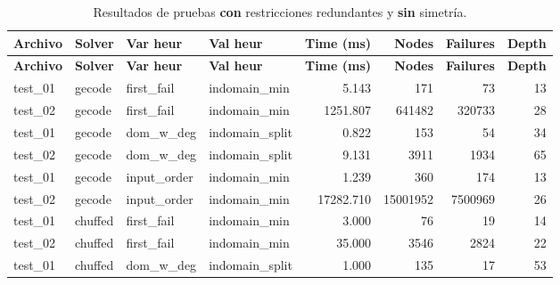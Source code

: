 \begin{longtable}{l l l l r r r r}
    \caption{Resultados de pruebas \textbf{con} restricciones redundantes y \textbf{sin} simetría.}\label{tab:pruebas-jobshop_mantenimiento-on-off-1}     \\
    \toprule
    \textbf{Archivo} & \textbf{Solver} & \textbf{Var heur} & \textbf{Val heur} & \textbf{Time (ms)} & \textbf{Nodes} & \textbf{Failures} & \textbf{Depth} \\
    \midrule
    \endfirsthead
    \toprule
    \textbf{Archivo} & \textbf{Solver} & \textbf{Var heur} & \textbf{Val heur} & \textbf{Time (ms)} & \textbf{Nodes} & \textbf{Failures} & \textbf{Depth} \\
    \midrule
    \endhead
    \bottomrule
    \endlastfoot

    test\_01         & gecode          & first\_fail       & indomain\_min     & 5.143              & 171            & 73                & 13             \\
    test\_02         & gecode          & first\_fail       & indomain\_min     & 1251.807           & 641482         & 320733            & 28             \\
    \midrule
    test\_01         & gecode          & dom\_w\_deg       & indomain\_split   & 0.822              & 153            & 54                & 34             \\
    test\_02         & gecode          & dom\_w\_deg       & indomain\_split   & 9.131              & 3911           & 1934              & 65             \\
    \midrule
    test\_01         & gecode          & input\_order      & indomain\_min     & 1.239              & 360            & 174               & 13             \\
    test\_02         & gecode          & input\_order      & indomain\_min     & 17282.710          & 15001952       & 7500969           & 26             \\
    \midrule
    test\_01         & chuffed         & first\_fail       & indomain\_min     & 3.000              & 76             & 19                & 14             \\
    test\_02         & chuffed         & first\_fail       & indomain\_min     & 35.000             & 3546           & 2824              & 22             \\
    \midrule
    test\_01         & chuffed         & dom\_w\_deg       & indomain\_split   & 1.000              & 135            & 17                & 53             \\

\end{longtable}
